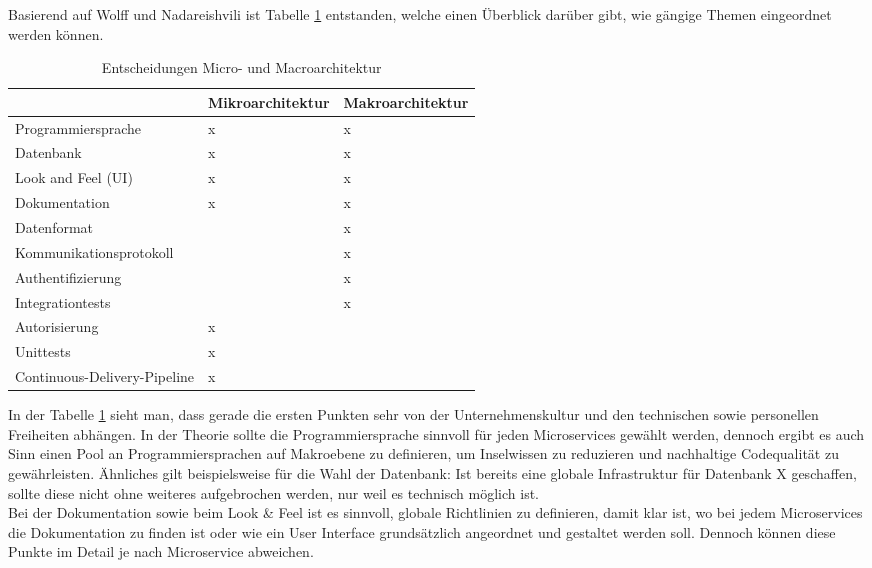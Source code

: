 Basierend auf Wolff und Nadareishvili ist Tabelle \ref{tab:macro_micro} entstanden, welche einen Überblick darüber gibt, wie gängige Themen eingeordnet werden können. \cite{wolff2018mic_praxis}\cite{irakli2016mic_arc}\cite{rewe2019mic_ppp}

\begin{table}[ht]
	\begin{center}
		\begin{tabular}{p{5cm}p{5cm}p{5cm}}
			& Mikroarchitektur & Makroarchitektur \\ \hline
			Programmiersprache &  x & x  \\
			Datenbank & x & x \\
			Look and Feel (UI) & x  & x  \\
			Dokumentation & x & x  \\
			Datenformat &   & x \\
			Kommunikationsprotokoll &   & x \\
			Authentifizierung &  & x \\
			Integrationtests &  &  x \\
			Autorisierung & x  &  \\
			Unittests & x  &  \\
			Continuous-Delivery-Pipeline & x &  \\
		\end{tabular}
	\end{center}
	\caption[Entscheidungen Micro- und Macroarchitektur]{Entscheidungen Micro- und Macroarchitektur}
	\label{tab:macro_micro} 
\end{table}

In der Tabelle \ref{tab:macro_micro} sieht man, dass gerade die ersten Punkten sehr von der Unternehmenskultur und den technischen sowie personellen Freiheiten abhängen. In der Theorie sollte die Programmiersprache sinnvoll für jeden Microservices gewählt werden, dennoch ergibt es auch Sinn einen Pool an Programmiersprachen auf Makroebene zu definieren, um Inselwissen zu reduzieren und nachhaltige Codequalität zu gewährleisten. Ähnliches gilt beispielsweise für die Wahl der Datenbank: Ist bereits eine globale Infrastruktur für Datenbank X geschaffen, sollte diese nicht ohne weiteres aufgebrochen werden, nur weil es technisch möglich ist. \\

Bei der Dokumentation sowie beim Look \& Feel ist es sinnvoll, globale Richtlinien zu definieren, damit klar ist, wo bei jedem Microservices die Dokumentation zu finden ist oder wie ein User Interface grundsätzlich angeordnet und gestaltet werden soll. Dennoch können diese Punkte im Detail je nach Microservice abweichen. \\


